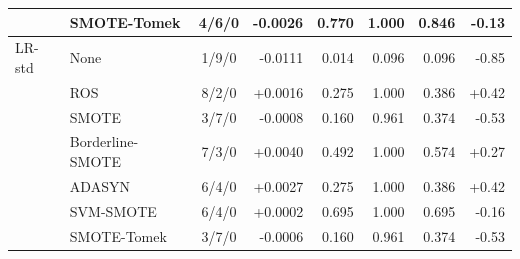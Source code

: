 \documentclass[10pt,a4paper]{article}
\begin{document}
\begin{center}
\begin{longtable}{@{}llcrrrrr@{}}
 & SMOTE-Tomek & 4/6/0 & -0.0026 & 0.770 & 1.000 & 0.846 & -0.13 \\
\midrule
LR-std & None & 1/9/0 & -0.0111 & 0.014 & 0.096 & 0.096 & -0.85 \\
 & ROS & 8/2/0 & +0.0016 & 0.275 & 1.000 & 0.386 & +0.42 \\
 & SMOTE & 3/7/0 & -0.0008 & 0.160 & 0.961 & 0.374 & -0.53 \\
 & Borderline-SMOTE & 7/3/0 & +0.0040 & 0.492 & 1.000 & 0.574 & +0.27 \\
 & ADASYN & 6/4/0 & +0.0027 & 0.275 & 1.000 & 0.386 & +0.42 \\
 & SVM-SMOTE & 6/4/0 & +0.0002 & 0.695 & 1.000 & 0.695 & -0.16 \\
 & SMOTE-Tomek & 3/7/0 & -0.0006 & 0.160 & 0.961 & 0.374 & -0.53 \\
\midrule
\bottomrule\end{longtable}\end{center}
\end{document}
